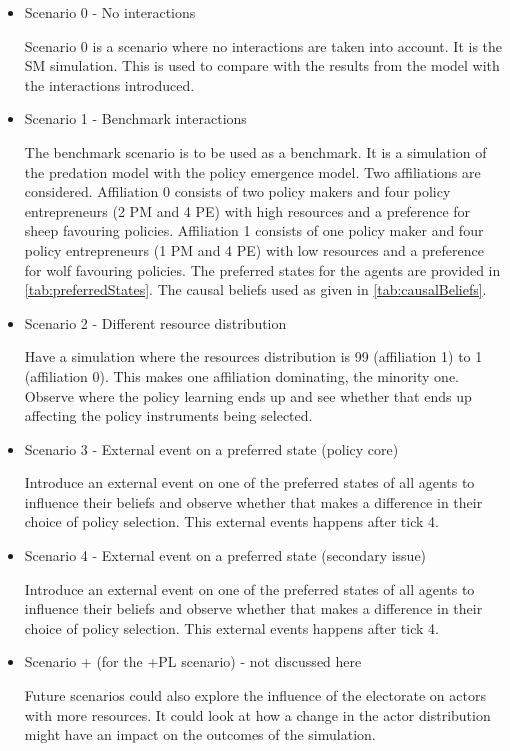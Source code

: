 \documentclass[12pt]{article}
\begin{document}
\begin{itemize}
\item Scenario 0 - No interactions

Scenario 0 is a scenario where no interactions are taken into account. It is the SM simulation. This is used to compare with the results from the model with the interactions introduced.


\item Scenario 1 - Benchmark interactions

The benchmark scenario is to be used as a benchmark. It is a simulation of the predation model with the policy emergence model. Two affiliations are considered. Affiliation 0 consists of two policy makers and four policy entrepreneurs (2 PM and 4 PE) with high resources and a preference for sheep favouring policies. Affiliation 1 consists of one policy maker and four policy entrepreneurs (1 PM and 4 PE) with low resources and a preference for wolf favouring policies. The preferred states for the agents are provided in \autoref{tab:preferredStates}. The causal beliefs used as given in \autoref{tab:causalBeliefs}.

\item Scenario 2 - Different resource distribution

Have a simulation where the resources distribution is 99 (affiliation 1) to 1 (affiliation 0). This makes one affiliation dominating, the minority one. Observe where the policy learning ends up and see whether that ends up affecting the policy instruments being selected.

\item Scenario 3 - External event on a preferred state (policy core)

Introduce an external event on one of the preferred states of all agents to influence their beliefs and observe whether that makes a difference in their choice of policy selection. This external events happens after tick 4.

\item Scenario 4 - External event on a preferred state (secondary issue)

Introduce an external event on one of the preferred states of all agents to influence their beliefs and observe whether that makes a difference in their choice of policy selection. This external events happens after tick 4.

\item Scenario + (for the +PL scenario) - not discussed here

Future scenarios could also explore the influence of the electorate on actors with more resources. It could look at how a change in the actor distribution might have an impact on the outcomes of the simulation.

\end{itemize}
\end{document}
